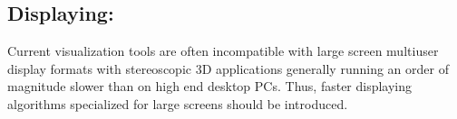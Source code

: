\documentclass[10pt,twocolumn,letterpaper]{article}
\begin{document}
\subsection{Displaying:}Current visualization tools are often incompatible with large screen multiuser display formats with stereoscopic 3D applications generally running an order of magnitude slower than on high end desktop PCs. Thus, faster displaying algorithms specialized for large screens should be introduced. 
\end{document}
